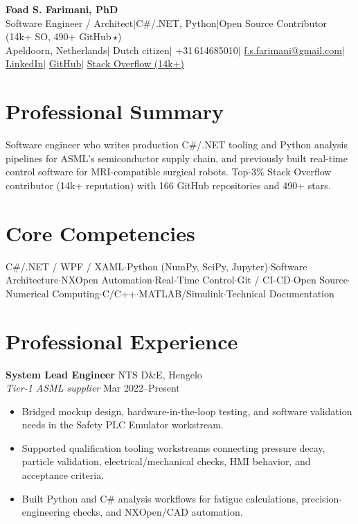 \documentclass[10pt,a4paper]{article}
\begin{document}
\begin{center}
 {\LARGE\bfseries Foad S. Farimani, PhD} \\[3pt]
 {\small Software Engineer / Architect\enspace$\mid$\enspace C\#/.NET, Python\enspace$\mid$\enspace Open Source Contributor (14k+ SO, 490+ GitHub\,$\star$)}
 \\[3pt]
 {\footnotesize
  Apeldoorn, Netherlands\enspace$\mid$\enspace
  Dutch citizen\enspace$\mid$\enspace
  +31\,614685010\enspace$\mid$\enspace
  \href{mailto:f.s.farimani@gmail.com}{f.s.farimani@gmail.com}\enspace$\mid$\enspace
  \href{https://linkedin.com/in/fsfarimani}{LinkedIn}\enspace$\mid$\enspace
  \href{https://github.com/Foadsf}{GitHub}\enspace$\mid$\enspace
  \href{https://stackoverflow.com/users/4999991}{Stack Overflow (14k+)}
 }
\end{center}

\section{Professional Summary}
Software engineer who writes production C\#/.NET tooling and Python analysis pipelines for ASML's semiconductor supply chain, and previously built real-time control software for MRI-compatible surgical robots. Top-3\% Stack Overflow contributor (14k+ reputation) with 166 GitHub repositories and 490+ stars.

\section{Core Competencies}
\begin{center}
\small C\#/.NET / WPF / XAML\enspace$\cdot$\enspace Python (NumPy, SciPy, Jupyter)\enspace$\cdot$\enspace Software Architecture\enspace$\cdot$\enspace NXOpen Automation\enspace$\cdot$\enspace Real-Time Control\enspace$\cdot$\enspace Git / CI-CD\enspace$\cdot$\enspace Open Source\enspace$\cdot$\enspace Numerical Computing\enspace$\cdot$\enspace C/C++\enspace$\cdot$\enspace MATLAB/Simulink\enspace$\cdot$\enspace Technical Documentation
\end{center}

\section{Professional Experience}

\textbf{System Lead Engineer} \hfill NTS D\&E, Hengelo \\
{\small\textit{Tier-1 ASML supplier}} \hfill {\small Mar 2022--Present}
\begin{itemize}
 \item Bridged mockup design, hardware-in-the-loop testing, and software validation needs in the Safety PLC Emulator workstream.
 \item Supported qualification tooling workstreams connecting pressure decay, particle validation, electrical/mechanical checks, HMI behavior, and acceptance criteria.
 \item Built Python and C\# analysis workflows for fatigue calculations, precision-engineering checks, and NXOpen/CAD automation.
\end{itemize}
\end{document}
